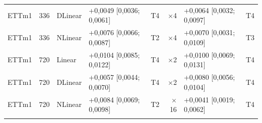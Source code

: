 {\begin{longtable}{@{}lrl l c r l c@{}}
ETTm1 & 336 & DLinear & +0{,}0049 [0{,}0036; 0{,}0061] & T4 & $\times$4 & +0{,}0064 [0{,}0032; 0{,}0097] & T4 \\
ETTm1 & 336 & NLinear & +0{,}0076 [0{,}0066; 0{,}0087] & T2 & $\times$4 & +0{,}0070 [0{,}0031; 0{,}0109] & T3 \\
ETTm1 & 720 & Linear & +0{,}0104 [0{,}0085; 0{,}0122] & T4 & $\times$2 & +0{,}0100 [0{,}0069; 0{,}0131] & T4 \\
ETTm1 & 720 & DLinear & +0{,}0057 [0{,}0044; 0{,}0070] & T4 & $\times$2 & +0{,}0080 [0{,}0056; 0{,}0104] & T4 \\
ETTm1 & 720 & NLinear & +0{,}0084 [0{,}0069; 0{,}0098] & T2 & $\times$16 & +0{,}0041 [0{,}0019; 0{,}0062] & T4 \\
\addlinespace[2pt]
\bottomrule
\end{longtable}
}
